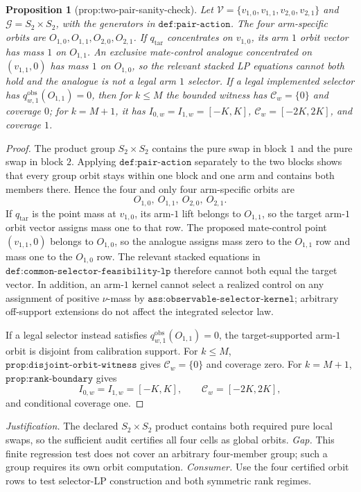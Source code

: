 \documentclass{article}
\newtheorem{proposition}{Proposition}
\begin{document}
\begin{proposition}[prop:two-pair-sanity-check]\label{prop:two-pair-sanity-check}
Let \(\mathcal V=\{v_{1,0},v_{1,1},v_{2,0},v_{2,1}\}\) and \(\mathcal G=S_2\times S_2\), with the generators in \(\texttt{def:pair-action}\). The four arm-specific orbits are \(O_{1,0},O_{1,1},O_{2,0},O_{2,1}\). If \(q_{\mathrm{tar}}\) concentrates on \(v_{1,0}\), its arm \(1\) orbit vector has mass \(1\) on \(O_{1,1}\). An exclusive mate-control analogue concentrated on \((v_{1,1},0)\) has mass \(1\) on \(O_{1,0}\), so the relevant stacked LP equations cannot both hold and the analogue is not a legal arm \(1\) selector. If a legal implemented selector has \(q^{\mathrm{obs}}_{w,1}(O_{1,1})=0\), then for \(k\le M\) the bounded witness has \(\mathcal C_w=\{0\}\) and coverage \(0\); for \(k=M+1\), it has \(I_{0,w}=I_{1,w}=[-K,K]\), \(\mathcal C_w=[-2K,2K]\), and coverage \(1\).
\end{proposition}
\begin{proof}
The product group \(S_2\times S_2\) contains the pure swap in block \(1\) and the pure swap in block \(2\). Applying \(\texttt{def:pair-action}\) separately to the two blocks shows that every group orbit stays within one block and one arm and contains both members there. Hence the four and only four arm-specific orbits are
\[
O_{1,0},\ O_{1,1},\ O_{2,0},\ O_{2,1}.
\]
If \(q_{\mathrm{tar}}\) is the point mass at \(v_{1,0}\), its arm-\(1\) lift belongs to \(O_{1,1}\), so the target arm-\(1\) orbit vector assigns mass one to that row. The proposed mate-control point \((v_{1,1},0)\) belongs to \(O_{1,0}\), so the analogue assigns mass zero to the \(O_{1,1}\) row and mass one to the \(O_{1,0}\) row. The relevant stacked equations in \(\texttt{def:common-selector-feasibility-lp}\) therefore cannot both equal the target vector. In addition, an arm-\(1\) kernel cannot select a realized control on any assignment of positive \(\nu\)-mass by \(\texttt{ass:observable-selector-kernel}\); arbitrary off-support extensions do not affect the integrated selector law.

If a legal selector instead satisfies \(q^{\mathrm{obs}}_{w,1}(O_{1,1})=0\), the target-supported arm-\(1\) orbit is disjoint from calibration support. For \(k\le M\), \(\texttt{prop:disjoint-orbit-witness}\) gives \(\mathcal C_w=\{0\}\) and coverage zero. For \(k=M+1\), \(\texttt{prop:rank-boundary}\) gives
\[
I_{0,w}=I_{1,w}=[-K,K],\qquad \mathcal C_w=[-2K,2K],
\]
and conditional coverage one.
\end{proof}
\par\smallskip\noindent \textit{Justification.} The declared \(S_2\times S_2\) product contains both required pure local swaps, so the sufficient audit certifies all four cells as global orbits. \textit{Gap.} This finite regression test does not cover an arbitrary four-member group; such a group requires its own orbit computation. \textit{Consumer.} Use the four certified orbit rows to test selector-LP construction and both symmetric rank regimes.
\end{document}
